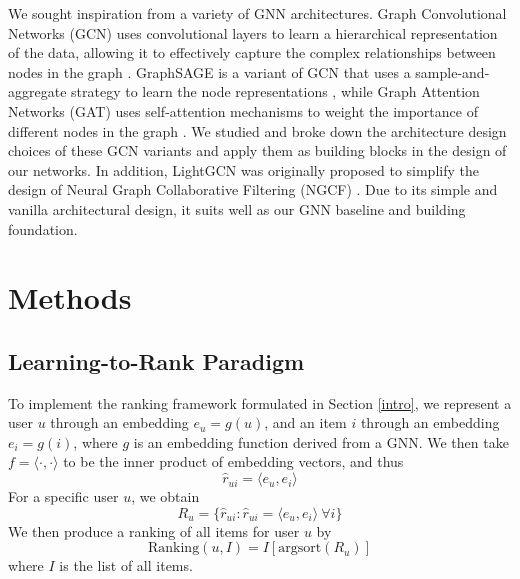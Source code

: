 \documentclass{article}
\begin{document}
We sought inspiration from a variety of GNN architectures. Graph Convolutional Networks (GCN) uses convolutional layers to learn a hierarchical representation of the data, allowing it to effectively capture the complex relationships between nodes in the graph \cite{gcn}. GraphSAGE is a variant of GCN that uses a sample-and-aggregate strategy to learn the node representations \cite{graphsage}, while Graph Attention Networks (GAT) uses self-attention mechanisms to weight the importance of different nodes in the graph \cite{gat}. We studied and broke down the architecture design choices of these GCN variants and apply them as building blocks in the design of our networks. In addition, LightGCN \cite{lightgcn} was originally proposed to simplify the design of Neural Graph Collaborative Filtering (NGCF) \cite{ngcf}. Due to its simple and vanilla architectural design, it suits well as our GNN baseline and building foundation. 

\section{Methods}


\subsection{Learning-to-Rank Paradigm}


To implement the ranking framework formulated in Section \ref{intro}, we represent a user $u$ through an embedding $e_u=g(u)$, and an item $i$ through an embedding $e_i=g(i)$, where $g$ is an embedding function derived from a GNN. We then take $f=\langle\cdot{,}\cdot\rangle$ to be the inner product of embedding vectors, and thus $$\hat r_{ui} = \langle e_u {,} e_i \rangle$$ 
For a specific user $u$, we obtain $$R_u =\{\hat r_{ui} : \hat r_{ui}=\langle e_u {,} e_i \rangle ~\forall i \}$$
We then produce a ranking of all items for user $u$ by $$\text{Ranking}(u, I) = I[\text{argsort}(R_u)]$$ where $I$ is the list of all items.
\end{document}
